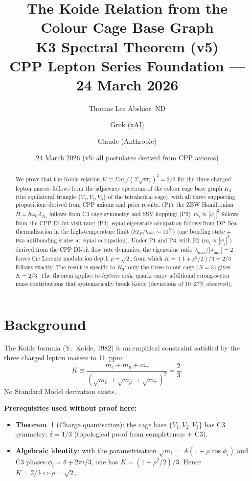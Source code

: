 \documentclass[11pt]{article}
\title{\textbf{The Koide Relation from the Colour Cage Base Graph}\\
\large K3 Spectral Theorem (v5)\\[4pt]
\normalsize CPP Lepton Series Foundation --- 24 March 2026}
\author{Thomas Lee Abshier, ND \and Grok (xAI) \and Claude (Anthropic)}
\date{24 March 2026 (v5: all postulates derived from CPP axioms)}
\begin{document}
\maketitle

\begin{abstract}
We prove that the Koide relation $K \equiv \Sigma m_i/(\Sigma\sqrt{m_i})^2 = 2/3$
for the three charged lepton masses follows from the adjacency spectrum of
the colour cage base graph $K_3$ (the equilateral triangle $\{V_1,V_2,V_3\}$
of the tetrahedral cage), with all three supporting propositions derived from CPP axioms and prior results.
(P1)~the ZBW Hamiltonian $\hat{H} = \hbar\omega_0 A_{K_3}$ follows from
C3 cage symmetry and SSV hopping; (P2)~$m_i \propto |\psi_i|^2$ follows from
the CPP DI-bit visit rate; (P3)~equal eigenstate occupation follows from
DP~Sea thermalisation in the high-temperature limit ($kT_P/\hbar\omega_0 \sim 10^{20}$)
(one bonding state $+$ two antibonding states at equal occupation).
Under P1 and P3, with P2 ($m_i \propto |\psi_i|^2$) derived from the
CPP DI-bit flow rate dynamics, the eigenvalue ratio $\lambda_{\max}/|\lambda_{\min}| = 2$
forces the Lorentz modulation depth $\rho = \sqrt{2}$, from which
$K = (1+\rho^2/2)/3 = 2/3$ follows exactly.
The result is specific to $K_3$: only the three-colour cage ($N=3$) gives
$K = 2/3$.  The theorem applies to \emph{leptons only}; quarks carry additional
strong-sector mass contributions that systematically break Koide (deviations
of 10--27\% observed).
\end{abstract}

\section{Background}

The Koide formula (Y.~Koide, 1982) is an empirical constraint satisfied by
the three charged lepton masses to 11~ppm:
\begin{equation}
K \equiv \frac{m_e + m_\mu + m_\tau}{(\sqrt{m_e}+\sqrt{m_\mu}+\sqrt{m_\tau})^2}
= \frac{2}{3}.
\label{eq:koide}
\end{equation}
No Standard Model derivation exists.

\textbf{Prerequisites used without proof here:}
\begin{itemize}
\item \textbf{Theorem~1} (Charge quantisation): the cage base $\{V_1,V_2,V_3\}$
  has C3 symmetry; $\delta = 1/3$ (topological proof from completeness $+$ C3).
\item \textbf{Algebraic identity}: with the parametrisation
  $\sqrt{m_i} = A(1+\rho\cos\phi_i)$ and C3 phases $\phi_i = \theta+2\pi i/3$,
  one has $K = (1+\rho^2/2)/3$.  Hence $K = 2/3 \Leftrightarrow \rho = \sqrt{2}$.
\end{itemize}
\end{document}
